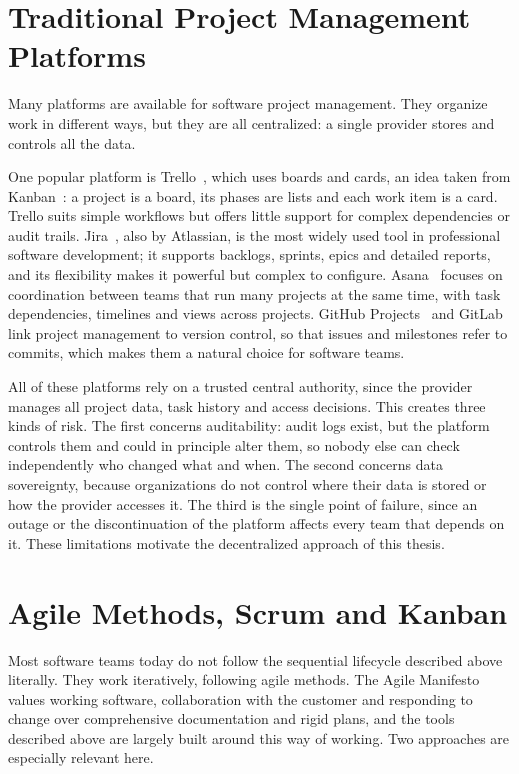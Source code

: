 \section{Traditional Project Management Platforms}
\label{sec:traditional-pm}

Many platforms are available for software project management. They organize work in different ways, but they are all centralized: a single provider stores and controls all the data.

One popular platform is Trello~\cite{trello}, which uses boards and cards, an idea taken from Kanban~\cite{anderson2010kanban}: a project is a board, its phases are lists and each work item is a card. Trello suits simple workflows but offers little support for complex dependencies or audit trails. Jira~\cite{jira}, also by Atlassian, is the most widely used tool in professional software development; it supports backlogs, sprints, epics and detailed reports, and its flexibility makes it powerful but complex to configure. Asana~\cite{asana} focuses on coordination between teams that run many projects at the same time, with task dependencies, timelines and views across projects. GitHub Projects~\cite{github} and GitLab~\cite{gitlab} link project management to version control, so that issues and milestones refer to commits, which makes them a natural choice for software teams.

All of these platforms rely on a trusted central authority, since the provider manages all project data, task history and access decisions. This creates three kinds of risk. The first concerns auditability: audit logs exist, but the platform controls them and could in principle alter them, so nobody else can check independently who changed what and when. The second concerns data sovereignty, because organizations do not control where their data is stored or how the provider accesses it. The third is the single point of failure, since an outage or the discontinuation of the platform affects every team that depends on it. These limitations motivate the decentralized approach of this thesis.

\section{Agile Methods, Scrum and Kanban}
\label{sec:agile}

Most software teams today do not follow the sequential lifecycle described above literally. They work iteratively, following agile methods. The Agile Manifesto~\cite{agilemanifesto} values working software, collaboration with the customer and responding to change over comprehensive documentation and rigid plans, and the tools described above are largely built around this way of working. Two approaches are especially relevant here.


